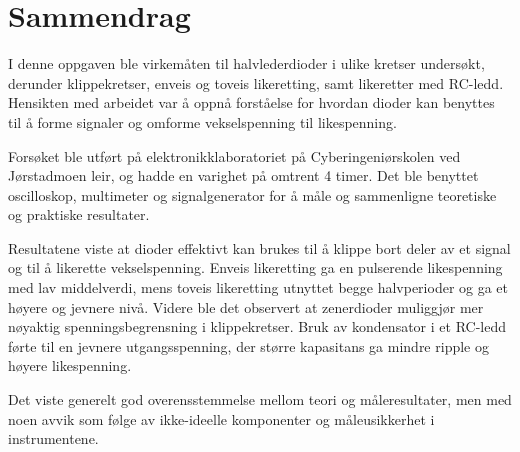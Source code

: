 \section*{Sammendrag}
    I denne oppgaven ble virkemåten til halvlederdioder i ulike kretser undersøkt, derunder klippekretser, enveis og toveis likeretting, samt likeretter med RC-ledd. Hensikten med arbeidet var å oppnå forståelse for hvordan dioder kan benyttes til å forme signaler og omforme vekselspenning til likespenning.

    Forsøket ble utført på elektronikklaboratoriet på Cyberingeniørskolen ved Jørstadmoen leir, og hadde en varighet på omtrent 4 timer. Det ble benyttet oscilloskop, multimeter og signalgenerator for å måle og sammenligne teoretiske og praktiske resultater.

    Resultatene viste at dioder effektivt kan brukes til å klippe bort deler av et signal og til å likerette vekselspenning. Enveis likeretting ga en pulserende likespenning med lav middelverdi, mens toveis likeretting utnyttet begge halvperioder og ga et høyere og jevnere nivå. Videre ble det observert at zenerdioder muliggjør mer nøyaktig spenningsbegrensning i klippekretser. Bruk av kondensator i et RC-ledd førte til en jevnere utgangsspenning, der større kapasitans ga mindre ripple og høyere likespenning.

    Det viste generelt god overensstemmelse mellom teori og måleresultater, men med noen avvik som følge av ikke-ideelle komponenter og måleusikkerhet i instrumentene.
